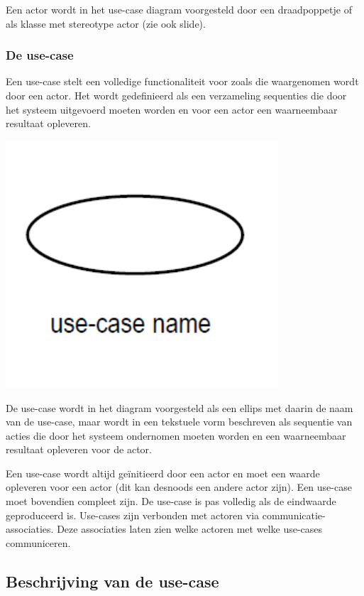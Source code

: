 Een actor wordt in het use-case diagram voorgesteld door een draadpoppetje of als klasse met stereotype actor (zie ook slide).

\subsubsection{De use-case}

Een use-case stelt een volledige functionaliteit voor zoals die waargenomen wordt door een actor. Het wordt gedefinieerd als een verzameling sequenties die door het systeem uitgevoerd moeten worden en voor een actor een waarneembaar resultaat opleveren.


\begin{center}
\includegraphics[width=4in]{img/usecase1}%
\end{center}

De use-case wordt in het diagram voorgesteld als een ellips met daarin de naam van de use-case, maar wordt in een tekstuele vorm beschreven als sequentie van acties die door het systeem ondernomen moeten worden en een waarneembaar resultaat opleveren voor de actor.

Een use-case wordt altijd geïnitieerd door een actor en moet een waarde opleveren voor een actor (dit kan desnoods een andere actor zijn). Een use-case moet bovendien compleet zijn. De use-case is pas volledig als de eindwaarde geproduceerd is.
Use-cases zijn verbonden met actoren via communicatie-associaties. Deze associaties laten zien welke actoren met welke use-cases communiceren.

\subsection{Beschrijving van de use-case}

